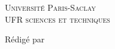 
\begin{center}\large
	\textsc{Université Paris-Saclay}\\
	\textsc{UFR sciences et techniques}
\end{center}


\begin{center}
	\begin{minipage}{0.4\textwidth}
		\begin{flushleft} \large
        	\noindent Rédigé par\\
			\Redac
		\end{flushleft}
	\end{minipage}
	\begin{minipage}{0.4\textwidth}
		\begin{flushright}\large
			\Date\\ %
		\end{flushright}
	\end{minipage}
\end{center}